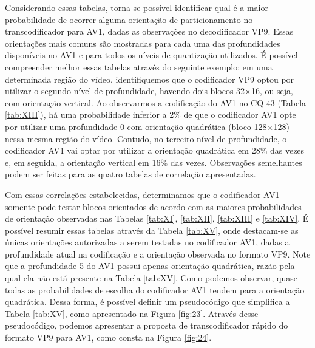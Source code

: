 




Considerando essas tabelas, torna-se possível identificar qual é a maior probabilidade de ocorrer alguma orientação de particionamento no transcodificador para AV1, dadas as observações no decodificador VP9. Essas orientações mais comuns são mostradas para cada uma das profundidades disponíveis no AV1 e para todos os níveis de quantização utilizados. É possível compreender melhor essas tabelas através do seguinte exemplo: em uma determinada região do vídeo, identifiquemos que o codificador VP9 optou por utilizar o segundo nível de profundidade, havendo dois blocos 32$\times$16, ou seja, com orientação vertical. Ao observarmos a codificação do AV1 no CQ 43 (Tabela \ref{tab:XIII}), há uma probabilidade inferior a 2\% de que o codificador AV1 opte por utilizar uma profundidade 0 com orientação quadrática (bloco 128$\times$128) nessa mesma região do vídeo. Contudo, no terceiro nível de profundidade, o codificador AV1 vai optar por utilizar a orientação quadrática em 28\% das vezes e, em seguida, a orientação vertical em 16\% das vezes. Observações semelhantes podem ser feitas para as quatro tabelas de correlação apresentadas.

Com essas correlações estabelecidas, determinamos que o codificador AV1 somente pode testar blocos orientados de acordo com as maiores probabilidades de orientação observadas nas Tabelas \ref{tab:XI}, \ref{tab:XII}, \ref{tab:XIII} e \ref{tab:XIV}. É possível resumir essas tabelas através da Tabela \ref{tab:XV}, onde destacam-se as únicas orientações autorizadas a serem testadas no codificador AV1, dadas a profundidade atual na codificação e a orientação observada no formato VP9. Note que a profundidade 5 do AV1 possui apenas orientação quadrática, razão pela qual ela não está presente na Tabela \ref{tab:XV}. Como podemos observar, quase todas as probabilidades de escolha do codificador AV1 tendem para a orientação quadrática. Dessa forma, é possível definir um pseudocódigo que simplifica a Tabela \ref{tab:XV}, como apresentado na Figura \ref{fig:23}. Através desse pseudocódigo, podemos apresentar a proposta de transcodificador rápido do formato VP9 para AV1, como consta na Figura \ref{fig:24}.





